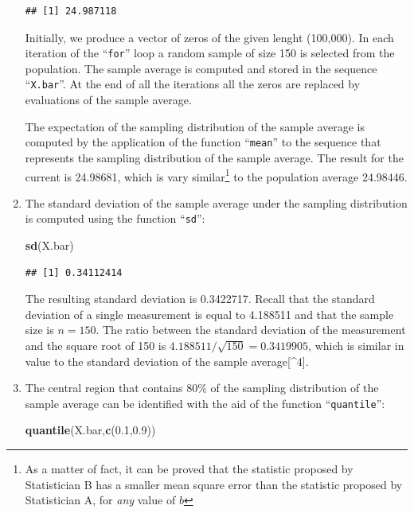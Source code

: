 \documentclass[]{krantz}
\makeatletter
\newenvironment{Shaded}{\begin{snugshade}}{\end{snugshade}}
\newcommand{\FloatTok}[1]{\textcolor[rgb]{0.00,0.00,0.81}{#1}}
\newcommand{\KeywordTok}[1]{\textcolor[rgb]{0.13,0.29,0.53}{\textbf{#1}}}
\newcommand{\NormalTok}[1]{#1}
\newenvironment{kframe}{%
\medskip{}
\setlength{\fboxsep}{.8em}
 \def\at@end@of@kframe{}%
 \ifinner\ifhmode%
  \def\at@end@of@kframe{\end{minipage}}%
  \begin{minipage}{\columnwidth}%
 \fi\fi%
 \def\FrameCommand##1{\hskip\@totalleftmargin \hskip-\fboxsep
 \colorbox{shadecolor}{##1}\hskip-\fboxsep
     \hskip-\linewidth \hskip-\@totalleftmargin \hskip\columnwidth}%
 \MakeFramed {\advance\hsize-\width
   \@totalleftmargin\z@ \linewidth\hsize
   \@setminipage}}%
 {\par\unskip\endMakeFramed%
 \at@end@of@kframe}
\renewenvironment{Shaded}{\begin{kframe}}{\end{kframe}}
\theoremstyle{definition}
\theoremstyle{definition}
\theoremstyle{definition}
\theoremstyle{remark}
\makeatother
\begin{document}
\begin{enumerate}
\begin{verbatim}
## [1] 24.987118
\end{verbatim}

  Initially, we produce a vector of zeros of the given lenght (100,000).
  In each iteration of the ``\texttt{for}'' loop a random sample of size 150 is
  selected from the population. The sample average is computed and stored
  in the sequence ``\texttt{X.bar}''. At the end of all the iterations all the
  zeros are replaced by evaluations of the sample average.

  The expectation of the sampling distribution of the sample average is
  computed by the application of the function ``\texttt{mean}'' to the sequence
  that represents the sampling distribution of the sample average. The
  result for the current is 24.98681, which is vary similar\footnote{As a matter of fact, it can be proved that the statistic proposed
    by Statistician B has a smaller mean square error than the statistic
    proposed by Statistician A, for \emph{any} value of \(b\)} to the
  population average 24.98446.
\item
  The standard deviation of the sample
  average under the sampling distribution is computed using the function
  ``\texttt{sd}'':

\begin{Shaded}
\begin{Highlighting}[]
\KeywordTok{sd}\NormalTok{(X.bar)}
\end{Highlighting}
\end{Shaded}

\begin{verbatim}
## [1] 0.34112414
\end{verbatim}

  The resulting standard deviation is 0.3422717. Recall that the standard
  deviation of a single measurement is equal to 4.188511 and that the
  sample size is \(n=150\). The ratio between the standard deviation of the
  measurement and the square root of 150 is
  \(4.188511/\sqrt{150} =0.3419905\), which is similar in value to the
  standard deviation of the sample average{[}\^{}4{]}.
\item
  The central region that contains 80\%
  of the sampling distribution of the sample average can be identified
  with the aid of the function ``\texttt{quantile}'':

\begin{Shaded}
\begin{Highlighting}[]
\KeywordTok{quantile}\NormalTok{(X.bar,}\KeywordTok{c}\NormalTok{(}\FloatTok{0.1}\NormalTok{,}\FloatTok{0.9}\NormalTok{))}
\end{Highlighting}
\end{Shaded}


\end{enumerate}
\end{document}
